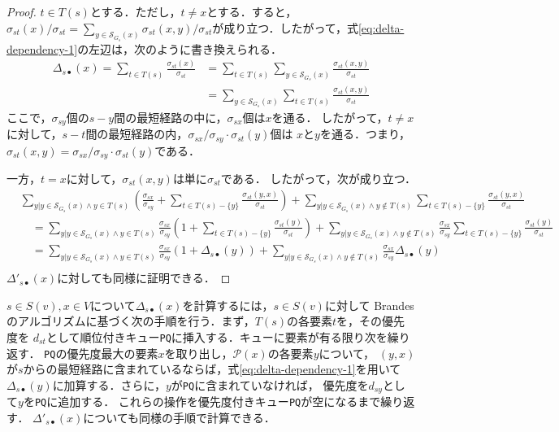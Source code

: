\begin{proof}
  $t\in T(s)$とする．ただし，$t\neq x$とする．すると，$\sigma_{st}(x)/\sigma_{st}=\sum_{y\in\mathcal{S}_{G_s}(x)}\sigma_{st}(x,y)/\sigma_{st}$が成り立つ．したがって，式\ref{eq:delta-dependency-1}の左辺は，次のように書き換えられる．
  \begin{equation*}
    \begin{aligned}
      \Delta_{s\bullet}(x)=\sum_{t\in T(s)}\frac{\sigma_{st}(x)}{\sigma_{st}}
      &=\sum_{t\in T(s)}\sum_{y\in\mathcal{S}_{G_s}(x)}\frac{\sigma_{st}(x,y)}{\sigma_{st}}\\
      &=\sum_{y\in\mathcal{S}_{G_s}(x)}\sum_{t\in T(s)}\frac{\sigma_{st}(x,y)}{\sigma_{st}}
    \end{aligned}
  \end{equation*}
  ここで，$\sigma_{sy}$個の$s-y$間の最短経路の中に，$\sigma_{sx}$個は$x$を通る．
  したがって，$t\neq x$に対して，$s-t$間の最短経路の内，$\sigma_{sx}/\sigma_{sy}\cdot\sigma_{st}(y)$個は
  $x$と$y$を通る．つまり，$\sigma_{st}(x,y)=\sigma_{sx}/\sigma_{sy}\cdot\sigma_{st}(y)$である．

  一方，$t=x$に対して，$\sigma_{st}(x,y)$は単に$\sigma_{st}$である．
  したがって，次が成り立つ．
  \begin{equation*}
    \begin{aligned}
      &\sum_{y|y\in\mathcal{S}_{G_s}(x)\land y\in T(s)}\left(\frac{\sigma_{sx}}{\sigma_{sy}}+\sum_{t\in T(s)-\{y\}}\frac{\sigma_{st}(y,x)}{\sigma_{st}}\right)
      +\sum_{y|y\in\mathcal{S}_{G_s}(x)\land y\notin T(s)}\sum_{t\in T(s)-\{y\}}\frac{\sigma_{st}(y,x)}{\sigma_{st}} \\
      &\quad=\sum_{y|y\in\mathcal{S}_{G_s}(x)\land y\in T(s)}\frac{\sigma_{sx}}{\sigma_{sy}}\left(1+\sum_{t\in T(s)-\{y\}}\frac{\sigma_{st}(y)}{\sigma_{st}}\right)
      +\sum_{y|y\in\mathcal{S}_{G_s}(x)\land y\notin T(s)}\frac{\sigma_{sx}}{\sigma_{sy}}\sum_{t\in T(s)-\{y\}}\frac{\sigma_{st}(y)}{\sigma_{st}} \\
      &\quad=\sum_{y|y\in\mathcal{S}_{G_s}(x)\land y\in T(s)}\frac{\sigma_{sx}}{\sigma_{sy}}\left(1+\Delta_{s\bullet}(y)\right)
      +\sum_{y|y\in\mathcal{S}_{G_s}(x)\land y\notin T(s)}\frac{\sigma_{sx}}{\sigma_{sy}}\Delta_{s\bullet}(y) \\
    \end{aligned}
  \end{equation*}
  $\Delta'_{s\bullet}(x)$に対しても同様に証明できる．
\end{proof}

$s\in S(v),x\in V$について$\Delta_{s\bullet}(x)$を計算するには，$s\in S(v)$に対して
Brandesのアルゴリズムに基づく次の手順を行う．まず，$T(s)$の各要素$t$を，その優先度を
$d_{st}$として順位付きキュー\texttt{PQ}に挿入する．キューに要素が有る限り次を繰り返す．
\texttt{PQ}の優先度最大の要素$x$を取り出し，$\mathcal{P}(x)$の各要素$y$について，
$(y,x)$が$s$からの最短経路に含まれているならば，式\eqref{eq:delta-dependency-1}を用いて
$\Delta_{s\bullet}(y)$に加算する．さらに，$y$が\texttt{PQ}に含まれていなければ，
優先度を$d_{sy}$として$y$を\texttt{PQ}に追加する．
これらの操作を優先度付きキュー\texttt{PQ}が空になるまで繰り返す．
$\Delta'_{s\bullet}(x)$についても同様の手順で計算できる．

